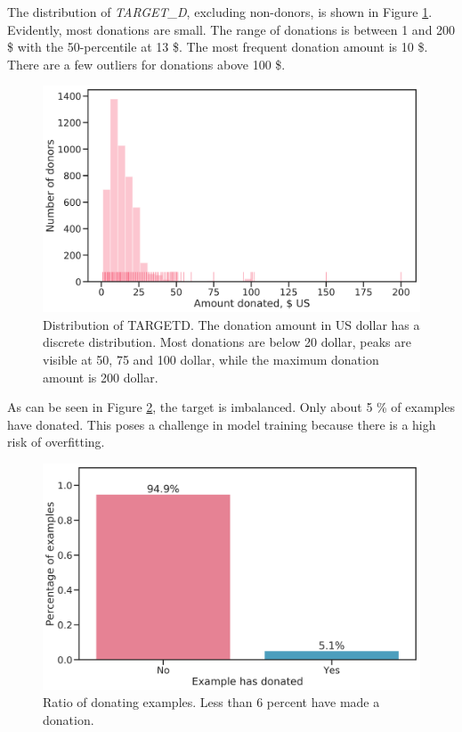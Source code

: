 \documentclass[
  11pt,
  a4paper,
  DIV=12,captions=tableheading,oneside]{scrbook}
\begin{document}
The distribution of \emph{TARGET\_D}, excluding non-donors, is shown in Figure \ref{fig:target-distrib}. Evidently, most donations are small. The range of donations is between 1 and 200 \$ with the 50-percentile at 13 \$. The most frequent donation amount is 10 \$. There are a few outliers for donations above 100 \$.

\begin{figure}

{\centering \includegraphics[width=0.7\linewidth]{figures/eda/target-distribution} 

}

\caption{Distribution of TARGETD. The donation amount in US dollar has a discrete distribution. Most donations are below 20 dollar, peaks are visible at 50, 75 and 100 dollar, while the maximum donation amount is 200 dollar.}\label{fig:target-distrib}
\end{figure}

As can be seen in Figure \ref{fig:target-ratio}, the target is imbalanced. Only about 5 \% of examples have donated. This poses a challenge in model training because there is a high risk of overfitting.

\begin{figure}

{\centering \includegraphics[width=0.7\linewidth]{figures/eda/ratio-binary} 

}

\caption{Ratio of donating examples. Less than 6 percent have made a donation.}\label{fig:target-ratio}
\end{figure}
\end{document}
